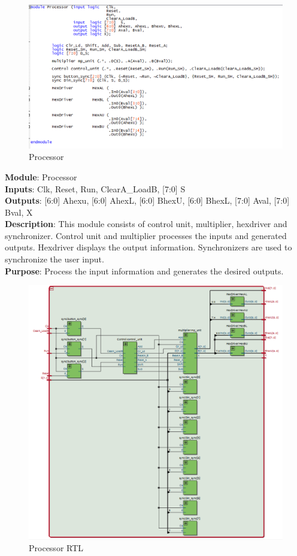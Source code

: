 \documentclass[12pt]{article}
\begin{document}
\begin{figure}[H]
    \centering
    \includegraphics[width=15cm]{processor.png}
    \caption{Processor}
\end{figure}
\textbf{Module}: Processor \\ 
\textbf{Inputs}: Clk, Reset, Run, ClearA\_LoadB, [7:0] S \\ 
\textbf{Outputs}: [6:0] Ahexu, [6:0] AhexL, [6:0] BhexU, [6:0] BhexL, [7:0] Aval, [7:0] Bval, X\\ 
\textbf{Description}: This module consists of control unit, multiplier, hexdriver and synchronizer. Control unit and multiplier processes the inputs and generated outputs. Hexdriver displays the output information. Synchronizers are used to synchronize the user input. \\ 
\textbf{Purpose}: Process the input information and generates the desired outputs. \\
\begin{figure}[H]
    \centering
    \includegraphics[width=15cm]{processor_RTL.png}
    \caption{Processor RTL}
\end{figure}
\end{document}
